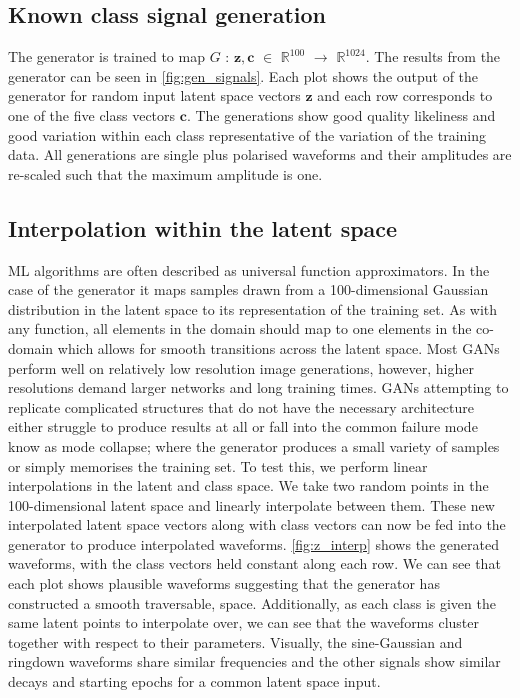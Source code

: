 \documentclass[12pt]{iopart}
\begin{document}
\subsection{Known class signal generation}

The generator is trained to map $G$ : $\mathbf{z},\mathbf{c} $ $\in$
$\mathbb{R}^{100}$ $\to$ $\mathbb{R}^{1024}$. The results from the
generator can be seen in \cref{fig:gen_signals}. Each plot shows the output of
the generator for random input latent space vectors $\mathbf{z}$ and each row
corresponds to one of the five class vectors $\mathbf{c}$. The generations show good quality likeliness and good variation within each class representative of the variation of the training data. All generations are single plus polarised waveforms and their amplitudes are re-scaled such that the maximum amplitude is one.

\subsection{Interpolation within the latent space}

%
\ac{ML} algorithms are often described as universal function approximators. In
the case of the generator it maps samples drawn from a 100-dimensional Gaussian
distribution in the latent space to its representation of the training set. As
with any function, all elements in the domain should map to one elements in the
co-domain which allows for smooth transitions across the latent space. Most GANs perform well on relatively low resolution
image generations, however, higher resolutions demand larger networks and long
training times. GANs attempting to replicate complicated structures that do not
have the necessary architecture either struggle to produce results at all or
fall into the common failure mode know as mode collapse; where the generator
produces a small variety of samples or simply memorises the training set. To
test this, we perform linear interpolations in the latent and class
space. We take two random
points in the 100-dimensional latent space and linearly interpolate between them. These new interpolated latent space vectors along with class vectors can now be fed into the generator to produce interpolated waveforms. \cref{fig:z_interp} shows the generated waveforms, with the class vectors held constant along each row. We can see that each plot shows plausible waveforms suggesting that
the generator has constructed a smooth traversable, space. Additionally, as each class is given
the same latent points to interpolate over, we can see that the waveforms
cluster together with respect to their parameters. Visually, the sine-Gaussian
and ringdown waveforms share similar frequencies and the other signals show
similar decays and starting epochs for a common latent space input. 
 
\end{document}
